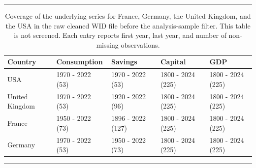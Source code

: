 \begin{table}[H]
\caption{Coverage of the underlying series for France, Germany, the United Kingdom, and the USA in the raw cleaned WID file before the analysis-sample filter. This table is not screened. Each entry reports first year, last year, and number of non-missing observations.}\label{tbl-country-series-coverage}
\hrule
\centering
\begin{tabularx}{\textwidth}{lXXXX}
\toprule
Country & Consumption & Savings & Capital & GDP\\
\midrule
USA & 1970 - 2022 (53) & 1970 - 2022 (53) & 1800 - 2024 (225) & 1800 - 2024 (225)\\
United Kingdom & 1970 - 2022 (53) & 1920 - 2022 (96) & 1800 - 2024 (225) & 1800 - 2024 (225)\\
France & 1950 - 2022 (73) & 1896 - 2022 (127) & 1800 - 2024 (225) & 1800 - 2024 (225)\\
Germany & 1970 - 2022 (53) & 1950 - 2022 (73) & 1800 - 2024 (225) & 1800 - 2024 (225)\\
\bottomrule
\end{tabularx}
\hrule
\end{table}
